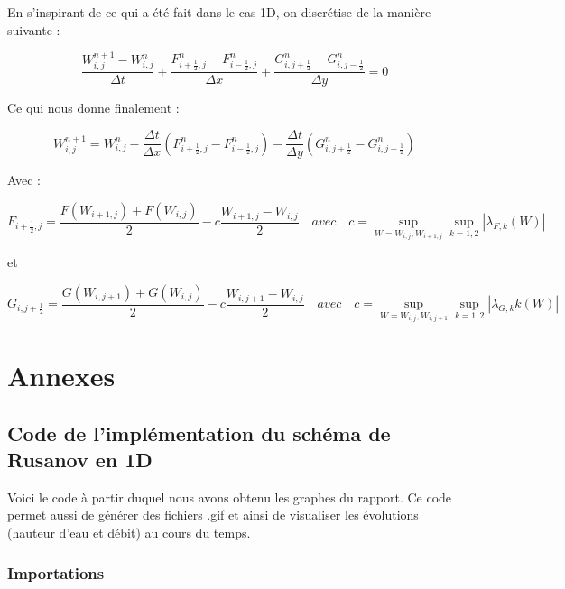 \documentclass[
11pt, %
francais, %
singlespacing, %
headsepline, %
]{MastersDoctoralThesis} %
\renewcommand{\thesection}{\arabic{section}}
\theoremstyle{definition}
\begin{document}
En s'inspirant de ce qui a été fait dans le cas 1D, on discrétise de la manière suivante :

$$ \frac{ W_{i,j}^{n+1} - W_{i,j}^{n} }{\Delta t} + \frac{ F_{i+\frac{1}{2},j}^{n} -  F_{i-\frac{1}{2},j}^{n} }{\Delta x} + \frac{G_{i,j+\frac{1}{2}}^{n} -  G_{i,j-\frac{1}{2}}^{n} }{\Delta y} = 0 $$

Ce qui nous donne finalement :

$$  W_{i,j}^{n+1} = W_{i,j}^n - \frac{\Delta t}{\Delta x} ( F_{i+\frac{1}{2},j}^{n} -  F_{i-\frac{1}{2},j}^{n} ) - \frac{\Delta t}{\Delta y} ( G_{i,j+\frac{1}{2}}^{n} -  G_{i,j-\frac{1}{2}}^{n} ) $$

Avec : 

$$ F_{i+\frac{1}{2},j} =  \frac{ F(W_{i+1,j}) + F(W_{i,j}) }{2} - c \frac{ W_{i+1,j} - W_{i,j} }{2} \quad avec \quad c = \sup_{W =  W_{i,j} ,  W_{i+1,j}} \sup_{k = 1,2} | \lambda _{F,k}(W) | $$

et

$$ G_{i,j+\frac{1}{2}} =  \frac{ G(W_{i,j+1}) + G(W_{i,j}) }{2} - c \frac{ W_{i,j+1} - W_{i,j} }{2} \quad avec \quad c = \sup_{W =  W_{i,j} ,  W_{i,j+1}} \sup_{k = 1,2} | \lambda _{G,k}k(W) | $$




\newpage
\renewcommand{\thesection}{\Alph{section}}
\appendix
\newpage
\section{Annexes}

    \hypertarget{impluxe9mentation-du-schuxe9ma-de-rusanov}{%
\subsection{Code de l'implémentation du schéma de Rusanov en 1D}\label{impluxe9mentation-du-schuxe9ma-de-rusanov}}

Voici le code à partir duquel nous avons obtenu les graphes du rapport.
Ce code permet aussi de générer des fichiers .gif et ainsi de visualiser
les évolutions (hauteur d'eau et débit) au cours du temps.

    \hypertarget{importations}{%
\subsubsection*{Importations}\label{importations}}
\end{document}

